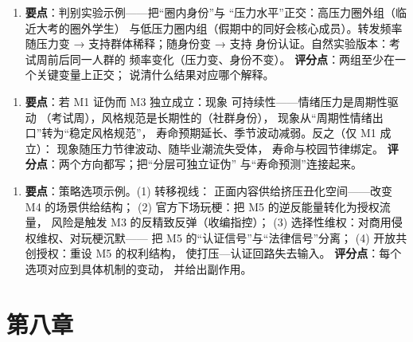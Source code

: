 \begin{enumerate}[label=\textbf{2.},leftmargin=2.6em]
  \item \textbf{要点}：判别实验示例——把“圈内身份”与
        “压力水平”正交：高压力圈外组（临近大考的圈外学生）
        与低压力圈内组（假期中的同好会核心成员）。转发频率
        随压力变 → 支持群体稀释；随身份变 → 支持
        身份认证。自然实验版本：考试周前后同一人群的
        频率变化（压力变、身份不变）。
        \textbf{评分点}：两组至少在一个关键变量上正交；
        说清什么结果对应哪个解释。
\end{enumerate}

\begin{enumerate}[label=\textbf{3.},leftmargin=2.6em]
  \item \textbf{要点}：若 M1 证伪而 M3 独立成立：现象
        可持续性——情绪压力是周期性驱动
        （考试周），风格规范是长期性的（社群身份），
        现象从“周期性情绪出口”转为“稳定风格规范”，
        寿命预期延长、季节波动减弱。反之（仅 M1 成立）：
        现象随压力节律波动、随毕业潮流失受体，
        寿命与校园节律绑定。
        \textbf{评分点}：两个方向都写；把“分层可独立证伪”
        与“寿命预测”连接起来。
\end{enumerate}

\begin{enumerate}[label=\textbf{4.},leftmargin=2.6em]
  \item \textbf{要点}：策略选项示例。(1) 转移视线：
        正面内容供给挤压丑化空间——改变 M4 的场景供给结构；
        (2) 官方下场玩梗：把 M5 的逆反能量转化为授权流量，
        风险是触发 M3 的反精致反弹（收编指控）；
        (3) 选择性维权：对商用侵权维权、对玩梗沉默——
        把 M5 的“认证信号”与“法律信号”分离；
        (4) 开放共创授权：重设 M5 的权利结构，
        使打压—认证回路失去输入。
        \textbf{评分点}：每个选项对应到具体机制的变动，
        并给出副作用。
\end{enumerate}

\section{第八章}\label{app:ans:08}

